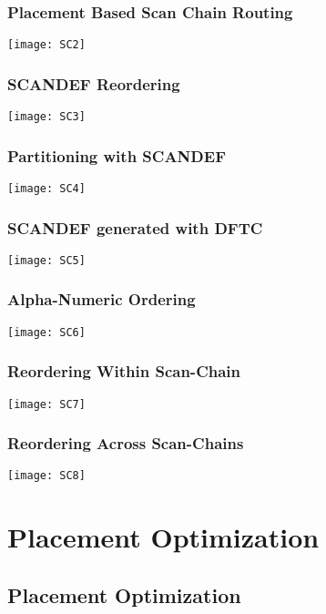 \documentclass[compress]{beamer}
\begin{document}
\begin{frame}
	\frametitle{Placement Based Scan Chain Routing}
	\begin{center}
		\texttt{[image: SC2]}
	\end{center}
\end{frame}
\begin{frame}
	\frametitle{SCANDEF Reordering}
		\begin{center}
		\texttt{[image: SC3]}
	\end{center}
\end{frame}

\begin{frame}
	\frametitle{Partitioning with SCANDEF}
	\begin{center}
		\texttt{[image: SC4]}
	\end{center}
\end{frame}

\begin{frame}
	\frametitle{SCANDEF generated with DFTC}
	\begin{center}
		\texttt{[image: SC5]}
	\end{center}
\end{frame}

\begin{frame}
	\frametitle{Alpha-Numeric Ordering}
	\begin{center}
		\texttt{[image: SC6]}
	\end{center}
\end{frame}

\begin{frame}
	\frametitle{Reordering Within Scan-Chain}
	\begin{center}
		\texttt{[image: SC7]}
	\end{center}
\end{frame}
\begin{frame}
	\frametitle{Reordering Across Scan-Chains}
	\begin{center}
		\texttt{[image: SC8]}
	\end{center}
\end{frame}


\section[Optimization]{Placement Optimization}
\subsection[Optimization]{Placement Optimization}
\end{document}
